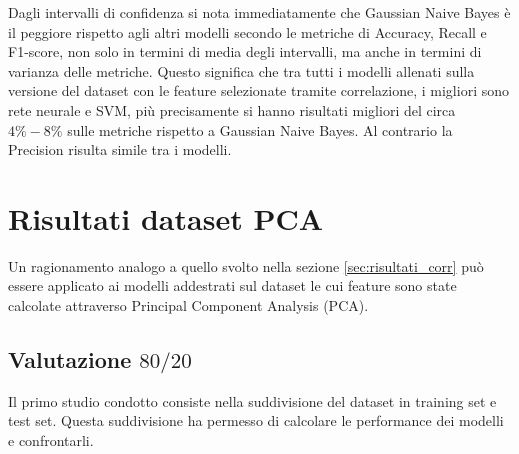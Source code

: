 Dagli intervalli di confidenza si nota immediatamente che Gaussian Naive Bayes è
il peggiore rispetto agli altri modelli secondo le metriche di Accuracy, Recall
e F1-score, non solo in termini di media degli intervalli, ma anche in termini
di varianza delle metriche. Questo significa che tra tutti i modelli allenati
sulla versione del dataset con le feature selezionate tramite correlazione, i
migliori sono rete neurale e SVM, più precisamente si hanno risultati migliori
del circa $4\%-8\%$ sulle metriche rispetto a Gaussian Naive Bayes. Al contrario
la Precision risulta simile tra i modelli.
\newpage
\section{Risultati dataset PCA} \label{sec:risultati_pca}
Un ragionamento analogo a quello svolto nella sezione \ref{sec:risultati_corr}
può essere applicato ai modelli addestrati sul dataset le cui feature sono state
calcolate attraverso Principal Component Analysis (PCA).
\subsection*{Valutazione $80/20$}
Il primo studio condotto consiste nella suddivisione del dataset in training
set e test set. Questa suddivisione ha permesso di calcolare le performance dei
modelli e confrontarli.


